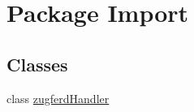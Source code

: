 \hypertarget{namespace_import}{\section{Package Import}
\label{namespace_import}
}
\subsection*{Classes}
\begin{DoxyCompactItemize}
\item 
class \hyperlink{class_import_1_1zugferd_handler}{zugferd\-Handler}
\end{DoxyCompactItemize}
